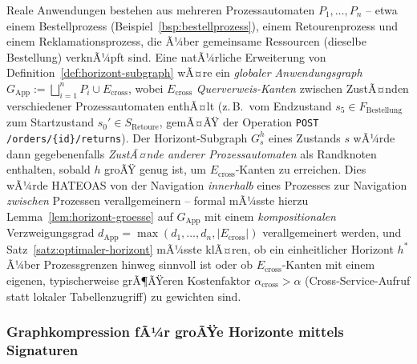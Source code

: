 ﻿\documentclass[a4paper,12pt]{article}
\theoremstyle{definition}
\begin{document}
Reale Anwendungen bestehen aus mehreren Prozessautomaten $P_1,\ldots,P_n$ -- etwa einem
Bestellprozess (Beispiel~\ref{bsp:bestellprozess}), einem Retourenprozess und einem
Reklamationsprozess, die Ã¼ber gemeinsame Ressourcen (dieselbe Bestellung) verknÃ¼pft sind.
Eine natÃ¼rliche Erweiterung von Definition~\ref{def:horizont-subgraph} wÃ¤re ein
\emph{globaler Anwendungsgraph} $G_{\mathrm{App}} := \bigsqcup_{i=1}^n P_i \cup
E_{\mathrm{cross}}$, wobei $E_{\mathrm{cross}}$ \emph{Querverweis-Kanten} zwischen
ZustÃ¤nden verschiedener Prozessautomaten enthÃ¤lt (z.\,B.\ vom Endzustand $s_5\in
F_{\text{Bestellung}}$ zum Startzustand $s_0'\in S_{\text{Retoure}}$, gemÃ¤ÃŸ der Operation
\texttt{POST /orders/\{id\}/returns}). Der Horizont-Subgraph $G_s^h$ eines Zustands $s$
wÃ¼rde dann gegebenenfalls \emph{ZustÃ¤nde anderer Prozessautomaten} als Randknoten
enthalten, sobald $h$ groÃŸ genug ist, um $E_{\mathrm{cross}}$-Kanten zu erreichen. Dies
wÃ¼rde HATEOAS von der Navigation \emph{innerhalb} eines Prozesses zur Navigation
\emph{zwischen} Prozessen verallgemeinern -- formal mÃ¼sste hierzu
Lemma~\ref{lem:horizont-groesse} auf $G_{\mathrm{App}}$ mit einem
\emph{kompositionalen} Verzweigungsgrad $d_{\mathrm{App}}=\max(d_1,\ldots,d_n,
|E_{\mathrm{cross}}|)$ verallgemeinert werden, und Satz~\ref{satz:optimaler-horizont}
mÃ¼sste klÃ¤ren, ob ein einheitlicher Horizont $h^\ast$ Ã¼ber Prozessgrenzen hinweg
sinnvoll ist oder ob $E_{\mathrm{cross}}$-Kanten mit einem eigenen, typischerweise
grÃ¶ÃŸeren Kostenfaktor $\alpha_{\mathrm{cross}}>\alpha$ (Cross-Service-Aufruf statt
lokaler Tabellenzugriff) zu gewichten sind.

\subsubsection{Graphkompression fÃ¼r groÃŸe Horizonte mittels Signaturen}
\end{document}
